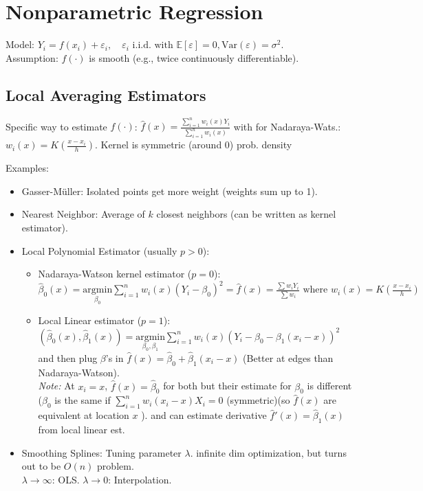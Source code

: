 \section{Nonparametric Regression}
Model: $Y_i = f(x_i) + \varepsilon_i, \quad \varepsilon_i \text{ i.i.d. with } \mathbb{E}[\varepsilon]=0, \text{Var}(\varepsilon)=\sigma^2$.
\\ Assumption: $f(\cdot)$ is smooth (e.g., twice continuously differentiable).

\subsection{Local Averaging Estimators}
Specific way to estimate $f(\cdot)$:
$ \hat{f}(x) = \frac{\sum_{i=1}^n w_i(x) Y_i}{\sum_{i=1}^n w_i(x)} $
with for Nadaraya-Wats.: $w_i(x) = K \left( \frac{x - x_i}{h} \right)$. Kernel is symmetric (around 0) prob. density 

Examples:
\begin{itemize}
    \item Gasser-Müller: Isolated points get more weight (weights sum up to 1).
    \item Nearest Neighbor: Average of $k$ closest neighbors (can be written as kernel estimator).
    \item Local Polynomial Estimator (usually $p > 0$):
    \begin{itemize}
        \item Nadaraya-Watson kernel estimator ($p=0$):
        $ \hat{\beta}_0(x) = \underset{\beta_0}{\text{argmin}} \sum_{i=1}^n w_i(x)(Y_i - \beta_0)^2 = \hat{f}(x) = \frac{\sum w_i Y_i}{\sum w_i} \text{ where } w_i(x) = K\left(\frac{x-x_i}{h}\right)$
        \item Local Linear estimator ($p=1$):
        $ (\hat{\beta}_0(x), \hat{\beta}_1(x)) = \underset{\beta_0, \beta_1}{\text{argmin}} \sum_{i=1}^n w_i(x)(Y_i - \beta_0 - \beta_1(x_i - x))^2 $ and then plug $\beta$'s in $\hat{f}(x) = \hat{\beta}_0 + \hat{\beta}_1(x_i - x)$
        (Better at edges than Nadaraya-Watson).
        \\ \textit{Note:} At $x_i=x$, $\hat{f}(x) = \hat{\beta}_0$ for both but their estimate for $\beta_0$ is different ($\beta_0$ is the same if $\sum_{i=1}^{n} w_{i}(x_i-x) X_{i} = 0$ (symmetric)(so $\hat{f}(x)$ are equivalent at location $x$ ). and can estimate derivative $\hat{f}'(x) = \hat{\beta}_1(x)$ from local linear est.
    \end{itemize}
    \item Smoothing Splines: Tuning parameter $\lambda$. infinite dim optimization, but turns out to be $O(n)$ problem.
    \\ $\lambda \to \infty$: OLS. $\lambda \to 0$: Interpolation.
\end{itemize}

